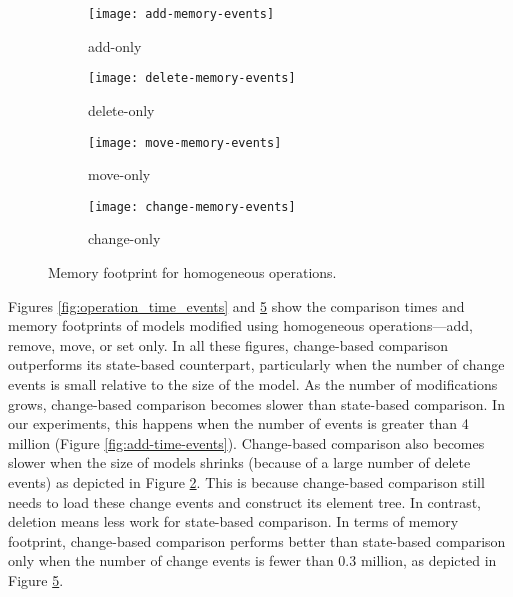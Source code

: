 \begin{figure}[ht]
  \centering
  \begin{subfigure}[t]{0.495\linewidth}
    \texttt{[image: add-memory-events]}
    \caption{add-only}
    \label{fig:add-memory-events}
  \end{subfigure}
  \hfill
  \begin{subfigure}[t]{0.495\linewidth}
    \texttt{[image: delete-memory-events]}
    \caption{delete-only}
    \label{fig:delete-memory-events}
  \end{subfigure}
  \begin{subfigure}[t]{0.495\linewidth}
    \texttt{[image: move-memory-events]}
    \caption{move-only}
    \label{fig:move-memory-events}
  \end{subfigure}
  \hfill
  \begin{subfigure}[t]{0.495\linewidth}
    \texttt{[image: change-memory-events]}
    \caption{change-only}
    \label{fig:change-memory-events}
  \end{subfigure}
  \caption{Memory footprint for homogeneous operations.}
  \label{fig:operation_memory_events}
\end{figure}

Figures \ref{fig:operation_time_events} and \ref{fig:operation_memory_events} show the comparison times and memory footprints of models modified using homogeneous operations—\textsf{add}, \textsf{remove}, \textsf{move}, or \textsf{set} only. In all these figures, change-based comparison outperforms its state-based counterpart, particularly when the number of change events is small relative to the size of the model. As the number of modifications grows, change-based comparison becomes slower than state-based comparison. In our experiments, this happens when the number of events is greater than 4 million (Figure \ref{fig:add-time-events}). Change-based comparison also becomes slower when the size of models shrinks (because of a large number of delete events) as depicted in Figure \ref{fig:delete-memory-events}. This is because change-based comparison still needs to load these change events and construct its element tree. In contrast, deletion means less work for state-based comparison. In terms of memory footprint, change-based comparison performs better than state-based comparison only when the number of change events is fewer than 0.3 million, as depicted in Figure \ref{fig:operation_memory_events}.

